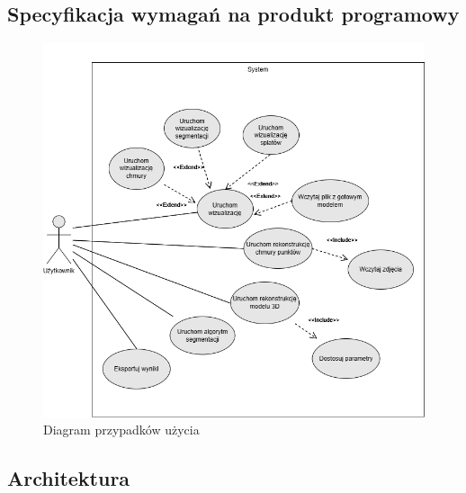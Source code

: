 \subsection{Specyfikacja wymagań na produkt programowy}

\begin{figure}[!htb]
    \includegraphics[width=1.0\linewidth]{img/diagramy/zpi use case.png}
    \caption{Diagram przypadków użycia}\label{fig:use_case_diagram}
  \end{figure}

\clearpage

\subsection{Architektura}

